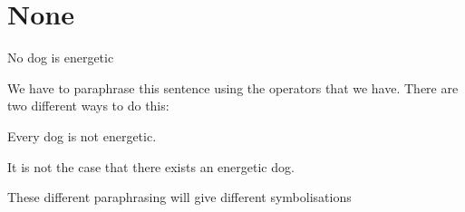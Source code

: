 %	
%	
%	


	
	
	\section{None}
	\begin{samplesent}
		\item No dog is energetic
	\end{samplesent}
	We have to paraphrase this sentence using the operators that we have. There are two different ways to do this:
		\begin{samplesent}
		\item Every dog is not energetic.
		\item It is not the case that there exists an energetic dog.
	\end{samplesent}
	These different paraphrasing will give different symbolisations
	
